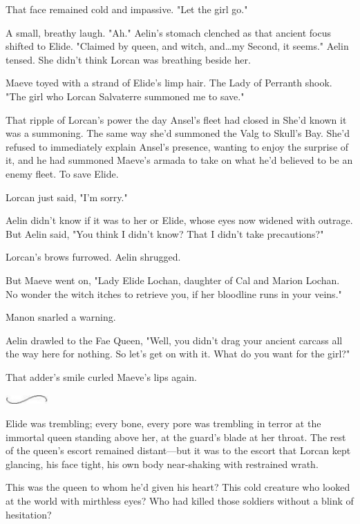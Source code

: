 That face remained cold and impassive.
"Let the girl go."

A small, breathy laugh.
"Ah."
Aelin's stomach clenched as that ancient focus shifted to Elide.
"Claimed by queen, and witch, and\ldots my Second, it seems."
Aelin tensed.
She didn't think Lorcan was breathing beside her.

Maeve toyed with a strand of Elide's limp hair.
The Lady of Perranth shook.
"The girl who Lorcan Salvaterre summoned me to save."

That ripple of Lorcan's power the day Ansel's fleet had closed in  She'd known it was a summoning.
The same way she'd summoned the Valg to Skull's Bay.
She'd refused to immediately explain Ansel's presence, wanting to enjoy the surprise of it, and he had summoned Maeve's armada to take on what he'd believed to be an enemy fleet.
To save Elide.

Lorcan just said, "I'm sorry."

Aelin didn't know if it was to her or Elide, whose eyes now widened with outrage.
But Aelin said, "You think I didn't know?
That I didn't take precautions?"

Lorcan's brows furrowed.
Aelin shrugged.

But Maeve went on, "Lady Elide Lochan, daughter of Cal and Marion Lochan.
No wonder the witch itches to retrieve you, if her bloodline runs in your veins."

Manon snarled a warning.

Aelin drawled to the Fae Queen, "Well, you didn't drag your ancient carcass all the way here for nothing.
So let's get on with it.
What do you want for the girl?"

That adder's smile curled Maeve's lips again.

\begin{center}
	\includegraphics[width=0.65in,height=0.13in]{images/seperator}
\end{center}

Elide was trembling; every bone, every pore was trembling in terror at the immortal queen standing above her, at the guard's blade at her throat.
The rest of the queen's escort remained distant---but it was to the escort that Lorcan kept glancing, his face tight, his own body near-shaking with restrained wrath.

This was the queen to whom he'd given his heart?
This cold creature who looked at the world with mirthless eyes?
Who had killed those soldiers without a blink of hesitation?

